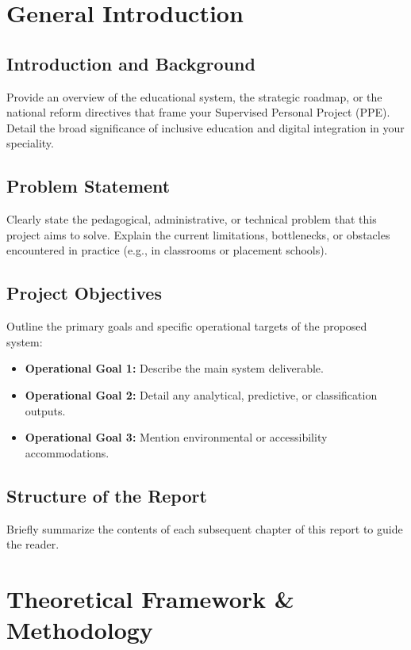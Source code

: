 \documentclass[12pt,a4paper]{report}
\begin{document}
\chapter{General Introduction}

\section{Introduction and Background}
Provide an overview of the educational system, the strategic roadmap, or the national reform directives that frame your Supervised Personal Project (PPE). Detail the broad significance of inclusive education and digital integration in your speciality.

\section{Problem Statement}
Clearly state the pedagogical, administrative, or technical problem that this project aims to solve. Explain the current limitations, bottlenecks, or obstacles encountered in practice (e.g., in classrooms or placement schools).

\section{Project Objectives}
Outline the primary goals and specific operational targets of the proposed system:
\begin{itemize}
  \item \textbf{Operational Goal 1:} Describe the main system deliverable.
  \item \textbf{Operational Goal 2:} Detail any analytical, predictive, or classification outputs.
  \item \textbf{Operational Goal 3:} Mention environmental or accessibility accommodations.
\end{itemize}

\section{Structure of the Report}
Briefly summarize the contents of each subsequent chapter of this report to guide the reader.

\chapter{Theoretical Framework & Methodology}
\end{document}
